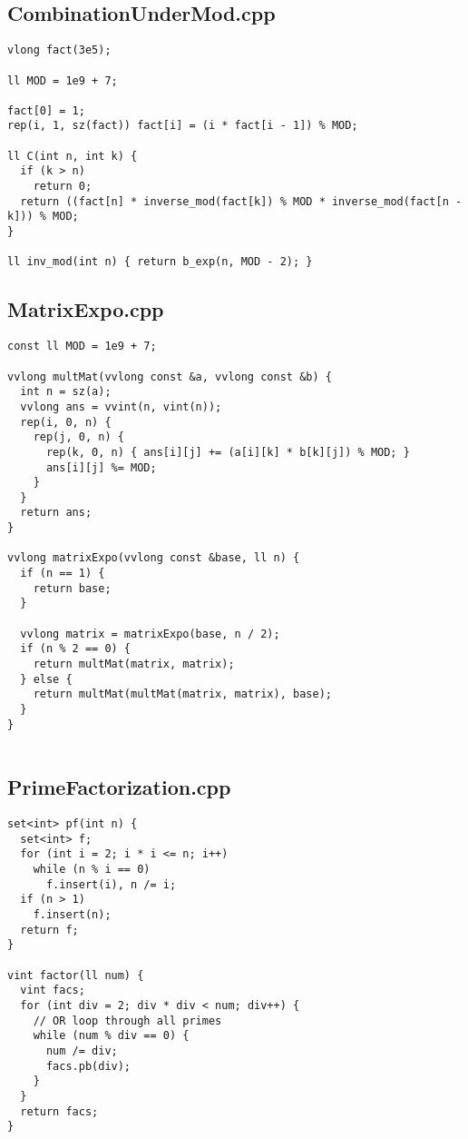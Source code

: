 \documentclass[10pt]{article}
\begin{document}
\begin{multicols*}{3}
\begin{lstlisting}
\end{lstlisting}
\subsection*{CombinationUnderMod.cpp}
\nopagebreak[4]
\begin{lstlisting}
vlong fact(3e5);

ll MOD = 1e9 + 7;

fact[0] = 1;
rep(i, 1, sz(fact)) fact[i] = (i * fact[i - 1]) % MOD;

ll C(int n, int k) {
  if (k > n)
    return 0;
  return ((fact[n] * inverse_mod(fact[k]) % MOD * inverse_mod(fact[n - k])) % MOD;
}

ll inv_mod(int n) { return b_exp(n, MOD - 2); }

\end{lstlisting}
\subsection*{MatrixExpo.cpp}
\nopagebreak[4]
\begin{lstlisting}
const ll MOD = 1e9 + 7;

vvlong multMat(vvlong const &a, vvlong const &b) {
  int n = sz(a);
  vvlong ans = vvint(n, vint(n));
  rep(i, 0, n) {
    rep(j, 0, n) {
      rep(k, 0, n) { ans[i][j] += (a[i][k] * b[k][j]) % MOD; }
      ans[i][j] %= MOD;
    }
  }
  return ans;
}

vvlong matrixExpo(vvlong const &base, ll n) {
  if (n == 1) {
    return base;
  }

  vvlong matrix = matrixExpo(base, n / 2);
  if (n % 2 == 0) {
    return multMat(matrix, matrix);
  } else {
    return multMat(multMat(matrix, matrix), base);
  }
}


\end{lstlisting}
\subsection*{PrimeFactorization.cpp}
\nopagebreak[4]
\begin{lstlisting}
set<int> pf(int n) {
  set<int> f;
  for (int i = 2; i * i <= n; i++)
    while (n % i == 0)
      f.insert(i), n /= i;
  if (n > 1)
    f.insert(n);
  return f;
}

vint factor(ll num) {
  vint facs;
  for (int div = 2; div * div < num; div++) {
    // OR loop through all primes
    while (num % div == 0) {
      num /= div;
      facs.pb(div);
    }
  }
  return facs;
}


\end{lstlisting}
\end{multicols*}
\end{document}
